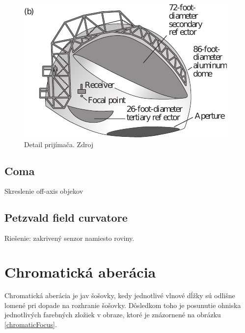 \begin{figure}
\includegraphics[scale=0.9]{obrazky-figures/areciboReceiver.pdf}
    \centering \caption{Detail prijímača. Zdroj\cite{hechtoptics}}
\end{figure}

\subsection{Coma}
Skreslenie off-axis objekov
\subsection{Petzvald field curvatore}
Riešenie: zakrivený senzor namiesto roviny.

\section{Chromatická aberácia}
Chromatická aberácia je jav šošovky, kedy jednotlivé vlnové dĺžky sú odlišne lomené pri dopade na
rozhranie šošovky. Dôsledkom toho je posunutie ohniska jednotlivých farebných zložiek v obraze, ktoré je
znázornené na obrázku \ref{chromaticFocus}. 

